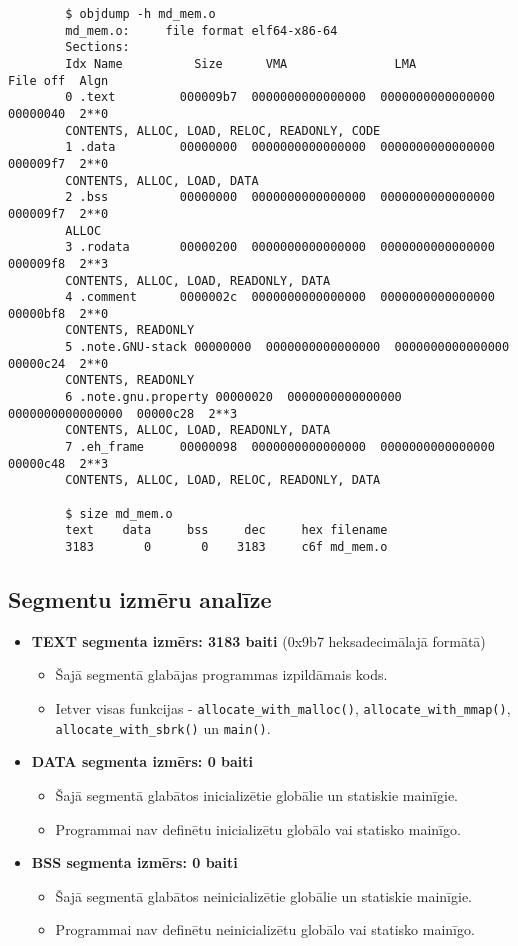 \documentclass{report}
\begin{document}
	\begin{verbatim}
		$ objdump -h md_mem.o
		md_mem.o:     file format elf64-x86-64
		Sections:
		Idx Name          Size      VMA               LMA               File off  Algn
		0 .text         000009b7  0000000000000000  0000000000000000  00000040  2**0
		CONTENTS, ALLOC, LOAD, RELOC, READONLY, CODE
		1 .data         00000000  0000000000000000  0000000000000000  000009f7  2**0
		CONTENTS, ALLOC, LOAD, DATA
		2 .bss          00000000  0000000000000000  0000000000000000  000009f7  2**0
		ALLOC
		3 .rodata       00000200  0000000000000000  0000000000000000  000009f8  2**3
		CONTENTS, ALLOC, LOAD, READONLY, DATA
		4 .comment      0000002c  0000000000000000  0000000000000000  00000bf8  2**0
		CONTENTS, READONLY
		5 .note.GNU-stack 00000000  0000000000000000  0000000000000000  00000c24  2**0
		CONTENTS, READONLY
		6 .note.gnu.property 00000020  0000000000000000  0000000000000000  00000c28  2**3
		CONTENTS, ALLOC, LOAD, READONLY, DATA
		7 .eh_frame     00000098  0000000000000000  0000000000000000  00000c48  2**3
		CONTENTS, ALLOC, LOAD, RELOC, READONLY, DATA
		
		$ size md_mem.o
		text    data     bss     dec     hex filename
		3183       0       0    3183     c6f md_mem.o
	\end{verbatim}
	
	\subsection{Segmentu izmēru analīze}
	
	\begin{itemize}
	\item \textbf{TEXT segmenta izmērs: 3183 baiti} (0x9b7 heksadecimālajā formātā)
	\begin{itemize}
		\item Šajā segmentā glabājas programmas izpildāmais kods.
		\item Ietver visas funkcijas - \texttt{allocate\_with\_malloc()}, \texttt{allocate\_with\_mmap()}, \texttt{allocate\_with\_sbrk()} un \texttt{main()}.
	\end{itemize}
	
	\item \textbf{DATA segmenta izmērs: 0 baiti}
	\begin{itemize}
		\item Šajā segmentā glabātos inicializētie globālie un statiskie mainīgie.
		\item Programmai nav definētu inicializētu globālo vai statisko mainīgo.
	\end{itemize}
	
	\item \textbf{BSS segmenta izmērs: 0 baiti}
	\begin{itemize}
		\item Šajā segmentā glabātos neinicializētie globālie un statiskie mainīgie.
		\item Programmai nav definētu neinicializētu globālo vai statisko mainīgo.
	\end{itemize}
	\end{itemize}
	
\end{document}

